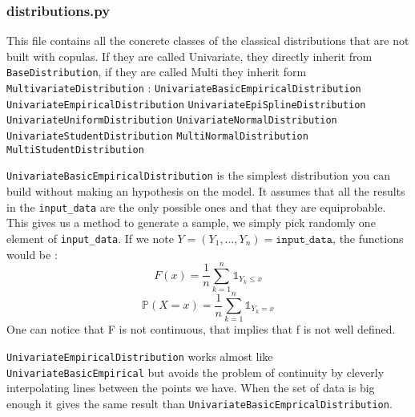 \documentclass{article}
\begin{document}
	 \subsubsection{distributions.py}

	 This file contains all the concrete classes of the classical distributions that are not built with copulas. If they are called Univariate, they directly inherit from \texttt{BaseDistribution}, if they are called Multi they inherit form \texttt{MultivariateDistribution} : \newline
\newline
	 \texttt{UnivariateBasicEmpiricalDistribution} \newline
	 \texttt{UnivariateEmpiricalDistribution} \newline
	 \texttt{UnivariateEpiSplineDistribution} \newline
	 \texttt{UnivariateUniformDistribution} \newline
	 \texttt{UnivariateNormalDistribution} \newline
	 \texttt{UnivariateStudentDistribution} \newline
	 \texttt{MultiNormalDistribution} \newline
	 \texttt{MultiStudentDistribution} \newline

	 \texttt{UnivariateBasicEmpiricalDistribution} is the simplest distribution you can build without making an hypothesis on the model. It assumes that all the results in the \texttt{input\_data} are the only possible ones and that they are equiprobable. This gives us a method to generate a sample, we simply pick randomly one element of \texttt{input\_data}. If we note $Y = (Y_1,...,Y_n) = \texttt{input\_data}$, the functions would be :
	\begin{equation*}
  	F(x) = \frac{1}{n}\sum_{k=1}^n \mathds{1}_{Y_k\leq x}
  	\end{equation*}
  	\begin{equation*}
  	\mathbb{P}(X=x) = \frac{1}{n}\sum_{k=1}^n \mathds{1}_{Y_k = x}
  	\end{equation*}
  	One can notice that F is not continuous, that implies that f is not well defined. \newline

	 \texttt{UnivariateEmpiricalDistribution} works almost like \texttt{UnivariateBasicEmpirical} but avoids the problem of continuity by cleverly interpolating lines between the points we have. When the set of data is big enough it gives the same result than \texttt{UnivariateBasicEmpricalDistribution}. \newline
\end{document}
